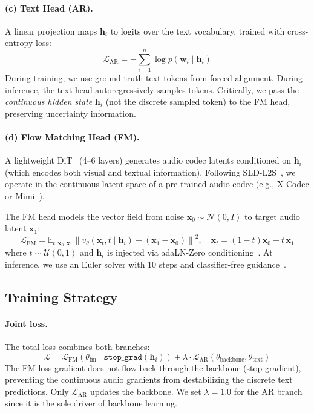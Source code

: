 \documentclass{article}
\begin{document}
\paragraph{(c) Text Head (AR).} A linear projection maps $\mathbf{h}_i$ to logits over the text vocabulary, trained with cross-entropy loss:
\begin{equation}
    \mathcal{L}_{\text{AR}} = -\sum_{i=1}^{n} \log p(\mathbf{w}_i \mid \mathbf{h}_i)
\end{equation}
During training, we use ground-truth text tokens from forced alignment. During inference, the text head autoregressively samples tokens. Critically, we pass the \textit{continuous hidden state} $\mathbf{h}_i$ (not the discrete sampled token) to the FM head, preserving uncertainty information.

\paragraph{(d) Flow Matching Head (FM).} A lightweight DiT~\cite{dit} (4--6 layers) generates audio codec latents conditioned on $\mathbf{h}_i$ (which encodes both visual and textual information). Following SLD-L2S~\cite{sldl2s}, we operate in the continuous latent space of a pre-trained audio codec (e.g., X-Codec or Mimi~\cite{moshi}).

The FM head models the vector field from noise $\mathbf{x}_0 \sim \mathcal{N}(0, I)$ to target audio latent $\mathbf{x}_1$:
\begin{equation}
    \mathcal{L}_{\text{FM}} = \mathbb{E}_{t, \mathbf{x}_0, \mathbf{x}_1} \left\| v_\theta(\mathbf{x}_t, t \mid \mathbf{h}_i) - (\mathbf{x}_1 - \mathbf{x}_0) \right\|^2, \quad \mathbf{x}_t = (1{-}t)\mathbf{x}_0 + t\,\mathbf{x}_1
\end{equation}
where $t \sim \mathcal{U}(0,1)$ and $\mathbf{h}_i$ is injected via adaLN-Zero conditioning~\cite{dit}. At inference, we use an Euler solver with 10 steps and classifier-free guidance~\cite{cfg}.

\subsection{Training Strategy}

\paragraph{Joint loss.} The total loss combines both branches:
\begin{equation}
    \mathcal{L} = \mathcal{L}_{\text{FM}}(\theta_{\text{fm}} \mid \texttt{stop\_grad}(\mathbf{h}_i)) + \lambda \cdot \mathcal{L}_{\text{AR}}(\theta_{\text{backbone}}, \theta_{\text{text}})
\end{equation}
The FM loss gradient does not flow back through the backbone (stop-gradient), preventing the continuous audio gradients from destabilizing the discrete text predictions. Only $\mathcal{L}_{\text{AR}}$ updates the backbone. We set $\lambda{=}1.0$ for the AR branch since it is the sole driver of backbone learning.
\end{document}
